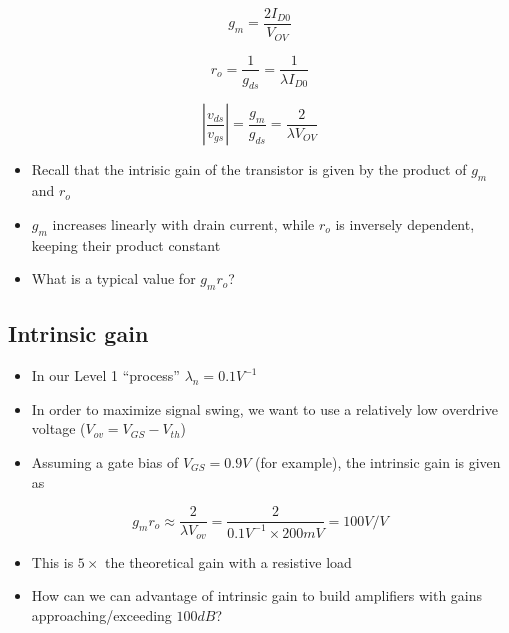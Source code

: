\documentclass[11pt]{article}
\providecommand{\tightlist}{%
      \setlength{\itemsep}{0pt}\setlength{\parskip}{0pt}}
\begin{document}
    \begin{equation}
g_m = \dfrac{2I_{D0}}{V_{OV}}
\end{equation}

\begin{equation}
r_o = \dfrac{1}{g_{ds}} = \dfrac{1}{\lambda I_{D0}}
\end{equation}

\begin{equation}
\left|\dfrac{v_{ds}}{v_{gs}}\right| = \dfrac{g_m}{g_{ds}} = \dfrac{2}{\lambda V_{OV}}
\end{equation}

    \begin{itemize}
\tightlist
\item
  Recall that the intrisic gain of the transistor is given by the
  product of \(g_m\) and \(r_o\)
\item
  \(g_m\) increases linearly with drain current, while \(r_o\) is
  inversely dependent, keeping their product constant
\item
  What is a typical value for \(g_m r_o\)?
\end{itemize}

    \hypertarget{intrinsic-gain}{%
\subsection{Intrinsic gain}\label{intrinsic-gain}}

    \begin{itemize}
\tightlist
\item
  In our Level 1 ``process'' \(\lambda_n = 0.1 V^{-1}\)
\item
  In order to maximize signal swing, we want to use a relatively low
  overdrive voltage (\(V_{ov} = V_{GS} - V_{th}\))
\item
  Assuming a gate bias of \(V_{GS} = 0.9V\) (for example), the intrinsic
  gain is given as
\end{itemize}

\begin{equation}
g_mr_o \approx \dfrac{2}{\lambda V_{ov}} = \dfrac{2}{0.1 V^{-1} \times 200mV} = 100 V/V
\end{equation}

\begin{itemize}
\tightlist
\item
  This is \(5 \times\) the theoretical gain with a resistive load
\item
  How can we can advantage of intrinsic gain to build amplifiers with
  gains approaching/exceeding \(100dB\)?
\end{itemize}
\end{document}
